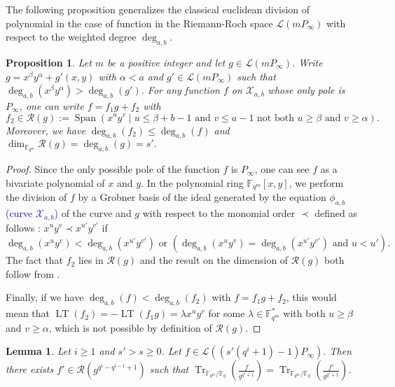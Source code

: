 \documentclass[a4paper]{article}
\newtheorem{proposition}[thm]{Proposition}
\newtheorem{lemma}[thm]{Lemma}
\theoremstyle{definition}
\theoremstyle{remark}
\newcommand{\calL}{\mathcal{L}}
\newcommand{\calR}{\mathcal{R}}
\newcommand{\calX}{\mathcal{X}}
\newcommand{\fqm}{\mathbb{F}_{q^m}}
\newcommand{\fq}{\mathbb{F}_{q}}
\newcommand{\F}{\mathbb{F}}
\newcommand{\Tr}[1]{\operatorname{Tr}_{\mathbb{F}_{q^m}/\fq}\left(#1\right)}
\newcommand{\Span}[1]{\operatorname{Span}\left(#1\right)}
\newcommand{\LT}[1]{\operatorname{LT}\left(#1\right)}
\newcommand{\degab}[1]{\deg_{a,b}\left(#1\right)}
\newcommand\sabira[1]{\textcolor{blue}{#1}}
\begin{document}
\noindent The following proposition generalizes the classical euclidean division of polynomial in the case of function in the Riemann-Roch space $\calL(mP_\infty)$ with respect to the weighted degree $\deg_{a,b}$.

\begin{proposition}\label{prop:div_grob}
Let $m$ be a positive integer and let $g \in \calL(m P_\infty)$. Write $g=x^\beta y^\alpha +g'(x,y)$ with $\alpha < a$ and $g' \in \calL(m P_\infty)$ such that $\degab{x^\beta y^\alpha}>\degab{g'}$.
For any function $f$ on $\calX_{a,b}$ whose only pole is $P_\infty$, one can write $f=f_1g+f_2$ with 
\[f_2 \in \calR(g):= \Span{x^u y^v \mid u \leq \beta + b-1 \text{ and } v\leq a-1 \text{ not both }  u \geq \beta \text{ and } v \geq \alpha}.\]
Moreover, we have $\degab{f_2} \leq \degab{f}$ and $\dim_{\fqm} \calR(g) = \degab{g}=s'.$ 
\end{proposition}

\begin{proof}
		Since the only possible pole of the function $f$ is $P_\infty$, one can see $f$ as a bivariate polynomial of $x$ and $y$. In the polynomial ring $\F_{q^m}[x,y]$, we perform the division of $f$ by a Grobner basis of the ideal generated by the equation $\phi_{a,b}$ \sabira{(curve $\calX_{a,b}$)} of the curve and $g$ with respect to the monomial order $\prec$ defined as follows : $x^uy^v \prec x^{u'}y^{v'}$ if
	\[ \degab{x^uy^v} < \degab{x^{u'}y^{v'}} \text{ or } \left(\degab{x^uy^v} = \degab{x^{u'}y^{v'}}  \text{ and } u < u'\right).\]
	The fact that $f_2$ lies in $\calR(g)$ and the result on the dimension of $\calR(g)$ both follow from \cite[Proposition 4]{GH00}.
	
	Finally, if we have $\degab{f} < \degab{f_2}$ with $f=f_1 g +f_2$, this would mean that $\LT{f_2}=-\LT{f_1 g}=\lambda x^uy^v$ for some $\lambda \in \F_{q^m}^*$ with both $u \geq \beta$ and $v \geq \alpha$, which is not possible by definition of $\calR\left(g\right)$.
\end{proof}


\begin{lemma} \label{lem:weighted_division}
	Let $i \geq 1$ and $s'>s \geq 0$. Let $f \in \calL\left(\left(s'(q^i+1)-1\right)P_\infty\right)$. Then there exists $f' \in \calR\left(g^{q^i-q^{i-1}+1}\right)$ such that $\Tr{\frac{f}{g^{q^i+1}}} = \Tr{\frac{f'}{g^{q^i+1}}} $.
\end{lemma}
\end{document}
